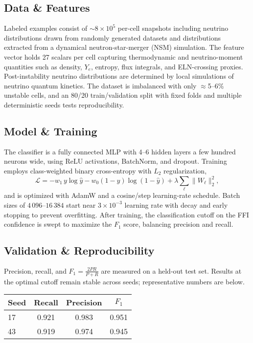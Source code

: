 \documentclass[10pt]{article}
\begin{document}
\begin{center}
\subsection*{Data \& Features}
Labeled examples consist of $\sim 8\times 10^5$ per-cell snapshots including neutrino distributions drawn from randomly generated datasets and distributions extracted from a dynamical neutron-star-merger (NSM) simulation.
The feature vector holds 27 scalars per cell capturing thermodynamic and neutrino-moment quantities such as density, $Y_e$, entropy, flux integrals, and ELN-crossing proxies.
Post-instability neutrino distributions are determined by local simulations of neutrino quantum kinetics.
The dataset is imbalanced with only $\approx$5--6\% unstable cells, and an 80/20 train/validation split with fixed folds and multiple deterministic seeds tests reproducibility.

\subsection*{Model \& Training}
The classifier is a fully connected MLP with 4--6 hidden layers a few hundred neurons wide, using ReLU activations, BatchNorm, and dropout.
Training employs class-weighted binary cross-entropy with $L_2$ regularization,
\begin{equation*}
\mathcal{L} = -w_1\, y\log \hat y - w_0 (1-y)\log(1-\hat y) + \lambda \sum_{\ell}\lVert W_\ell\rVert_2^2,
\end{equation*}
and is optimized with AdamW and a cosine/step learning-rate schedule.
Batch sizes of $4\,096$--$16\,384$ start near $3\times 10^{-3}$ learning rate with decay and early stopping to prevent overfitting.
After training, the classification cutoff on the FFI confidence is swept to maximize the $F_1$ score, balancing precision and recall.

\subsection*{Validation \& Reproducibility}
Precision, recall, and $F_1 = \frac{2PR}{P+R}$ are measured on a held-out test set.
Results at the optimal cutoff remain stable across seeds; representative numbers are below.

\begin{center}
\begin{tabular}{@{}lccc@{}}
\toprule
Seed & Recall & Precision & $F_1$ \\\midrule
17 & 0.921 & 0.983 & 0.951 \\
43 & 0.919 & 0.974 & 0.945 \\
\bottomrule
\end{tabular}
\end{center}


\end{center}
\end{document}
